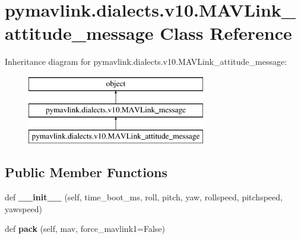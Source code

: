 \hypertarget{classpymavlink_1_1dialects_1_1v10_1_1MAVLink__attitude__message}{}\section{pymavlink.\+dialects.\+v10.\+M\+A\+V\+Link\+\_\+attitude\+\_\+message Class Reference}
\label{classpymavlink_1_1dialects_1_1v10_1_1MAVLink__attitude__message}
Inheritance diagram for pymavlink.\+dialects.\+v10.\+M\+A\+V\+Link\+\_\+attitude\+\_\+message\+:\begin{figure}[H]
\begin{center}
\leavevmode
\includegraphics[height=3.000000cm]{classpymavlink_1_1dialects_1_1v10_1_1MAVLink__attitude__message}
\end{center}
\end{figure}
\subsection*{Public Member Functions}
\begin{DoxyCompactItemize}
\item 
\mbox{\label{classpymavlink_1_1dialects_1_1v10_1_1MAVLink__attitude__message_ae9ac69f1536e74afb4b47665844e3c1a}} 
def {\bfseries \+\_\+\+\_\+init\+\_\+\+\_\+} (self, time\+\_\+boot\+\_\+ms, roll, pitch, yaw, rollspeed, pitchspeed, yawspeed)
\item 
\mbox{\label{classpymavlink_1_1dialects_1_1v10_1_1MAVLink__attitude__message_a29e1b5d115b7b86c048803ee7054bc7f}} 
def {\bfseries pack} (self, mav, force\+\_\+mavlink1=False)
\end{DoxyCompactItemize}
